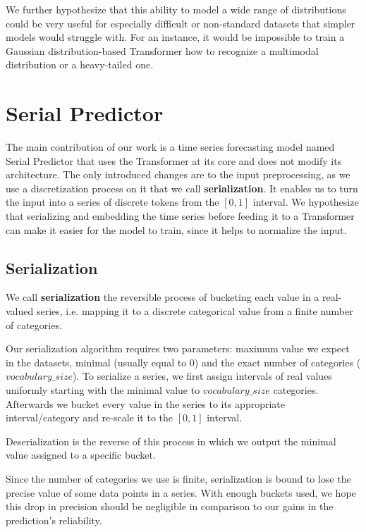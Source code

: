 \documentclass[en]{pracamgr}
\begin{document}
We further hypothesize that this ability to model a wide range of distributions could be very useful for especially difficult or non-standard datasets that simpler models would struggle with. For an instance, it would be impossible to train a Gaussian distribution-based Transformer how to recognize a multimodal distribution or a heavy-tailed one.

\section{Serial Predictor}
The main contribution of our work is a time series forecasting model named Serial Predictor that uses the Transformer at its core and does not modify its architecture. The only introduced changes are to the input preprocessing, as we use a discretization process on it that we call \textbf{serialization}. It enables us to turn the input into a series of discrete tokens from the $[0, 1]$ interval. We hypothesize that serializing and embedding the time series before feeding it to a Transformer can make it easier for the model to train, since it helps to normalize the input.


\subsection{Serialization}


We call \textbf{serialization} the reversible process of bucketing each value in a real-valued series, i.e. mapping it to a discrete categorical value from a finite number of categories.

Our serialization algorithm requires two parameters: maximum value we expect in the datasets, minimal (usually equal to 0) and the exact number of categories ($vocabulary\_size$).
To serialize a series, we first assign intervals of real values uniformly starting with the minimal value to $vocabulary\_size$ categories.
Afterwards we bucket every value in the series to its appropriate interval/category and re-scale it to the $[0, 1]$ interval.


Deserialization is the reverse of this process in which we output the minimal value assigned to a specific bucket. 

Since the number of categories we use is finite, serialization is bound to lose the precise value of some data points in a series. With enough buckets used, we hope this drop in precision should be negligible in comparison to our gains in the prediction's reliability. 
\end{document}
